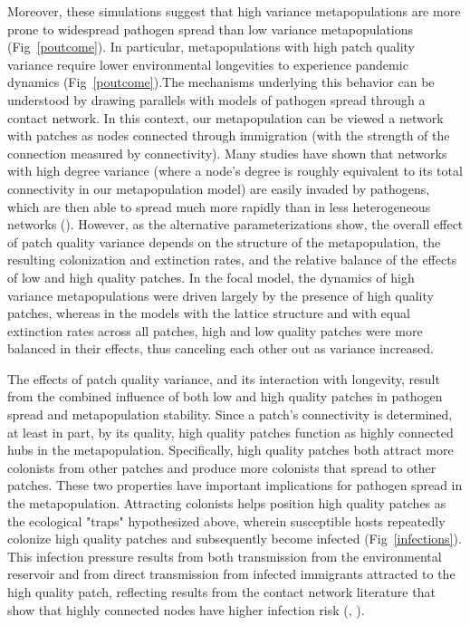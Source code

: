 \documentclass{svjour3}
\begin{document}
Moreover, these simulations suggest that high variance metapopulations are more prone to widespread pathogen spread than low variance metapopulations (Fig~\ref{poutcome}).  In particular, metapopulations with high patch quality variance require lower environmental longevities to experience pandemic dynamics (Fig~\ref{poutcome}).The mechanisms underlying this behavior can be understood by drawing parallels with models of pathogen spread through a contact network.  In this context, our metapopulation can be viewed a network with patches as nodes connected through immigration (with the strength of the connection measured by connectivity).  Many studies have shown that networks with high degree variance (where a node's degree is roughly equivalent to its total connectivity in our metapopulation model) are easily invaded by pathogens, which are then able to spread much more rapidly than in less heterogeneous networks (\cite{Pastor-Satorras2001}).  However, as the alternative parameterizations show, the overall effect of patch quality variance depends on the structure of the metapopulation, the resulting colonization and extinction rates, and the relative balance of the effects of low and high quality patches.  In the focal model, the dynamics of high variance metapopulations were driven largely by the presence of high quality patches, whereas in the models with the lattice structure and with equal extinction rates across all patches, high and low quality patches were more balanced in their effects, thus canceling each other out as variance increased.   

The effects of patch quality variance, and its interaction with longevity, result from the combined influence of both low and high quality patches in pathogen spread and metapopulation stability.  Since a patch's connectivity is determined, at least in part, by its quality, high quality patches function as highly connected hubs in the metapopulation.  Specifically, high quality patches both attract more colonists from other patches and produce more colonists that spread to other patches.  These two properties have important implications for pathogen spread in the metapopulation. Attracting colonists helps position high quality patches as the ecological "traps" hypothesized above, wherein susceptible hosts repeatedly colonize high quality patches and subsequently become infected (Fig~\ref{infections}).  This infection pressure results from both transmission from the environmental reservoir and from direct transmission from infected immigrants attracted to the high quality patch, reflecting results from the contact network literature that show that highly connected nodes have higher infection risk (\cite{Christley2005}, \cite{Keeling2005}).  
\end{document}
